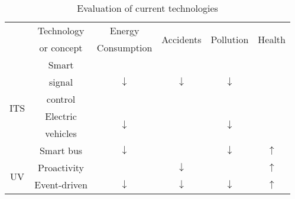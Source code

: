 \documentclass[letterpaper, twocolumn, 10pt, conference]{IEEEtran}
\begin{document}
\begin{table}[h!]
        \caption{Evaluation of current technologies}
        \begin{center}
                \begin{tabular}{|c|c|c|c|c|c|}
                        \hline
                                             &  Technology  &            Energy             &  \multirow{2}{*}{Accidents}   &  \multirow{2}{*}{Pollution}   & \multirow{2}{*}{Health} \\
                                             &  or concept  &          Consumption          &                               &                               &                         \\ \hline
                        \multirow{6}{*}{ITS} &    Smart     & \multirow{3}{*}{$\downarrow$} & \multirow{3}{*}{$\downarrow$} & \multirow{3}{*}{$\downarrow$} &                         \\
                                             &    signal    &                               &                               &                               &                         \\
                                             &   control    &                               &                               &                               &                         \\ \cline{2-6}
                                             &   Electric   & \multirow{2}{*}{$\downarrow$} &                               & \multirow{2}{*}{$\downarrow$} &                         \\
                                             &   vehicles   &                               &                               &                               &                         \\ \cline{2-6}
                                             &  Smart bus   &         $\downarrow$          &                               &         $\downarrow$          &       $\uparrow$        \\ \hline
                        \multirow{2}{*}{UV}  & Proactivity  &                               &         $\downarrow$          &                               &       $\uparrow$        \\ \cline{2-6}
                                             & Event-driven &         $\downarrow$          &         $\downarrow$          &         $\downarrow$          &       $\uparrow$        \\ \hline
                \end{tabular}
                \label{tbl:gwy:uv_lifestyle}
        \end{center}
\end{table}
\end{document}

